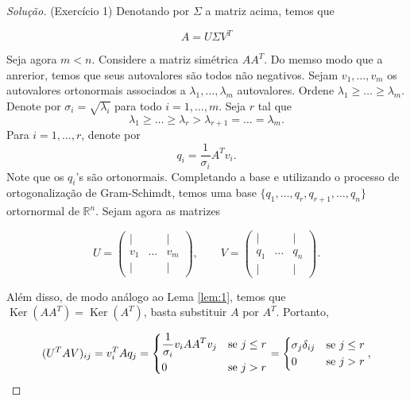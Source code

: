 \documentclass[a4paper,10pt]{article}
\newenvironment{solution}
  {\begin{proof}[Solução]}
  {\end{proof}}
\DeclareMathOperator{\Ker}{Ker}
\begin{document}
\begin{solution}{(Exercício 1)}
    Denotando por $\Sigma$ a matriz acima, temos que

    \begin{equation*}
      A = U\Sigma V^T
    \end{equation*}

    Seja agora $m<n$. Considere a matriz simétrica $AA^T$. Do memso modo que a anrerior,
    temos que seus autovalores são todos não negativos. Sejam $v_1,\dots,v_m$ os autovalores
    ortonormais associados a $\lambda_1, \dots, \lambda_m$ autovalores. Ordene
    $\lambda_1 \geq \dots \geq \lambda_m$. Denote por $\sigma_i = \sqrt{\lambda_i}$ para
    todo $i=1,\dots,m$. Seja $r$ tal que
    \begin{equation*}
      \lambda_1 \geq \dots \geq \lambda_r > \lambda_{r+1} = \dots = \lambda_m.
    \end{equation*}
    Para $i=1,\dots,r$, denote por
    \begin{equation*}
      q_i = \frac{1}{\sigma_i}A^Tv_i.
    \end{equation*}
    Note que os $q_i$'s são ortonormais. Completando a base e utilizando o processo
    de ortogonalização de Gram-Schimdt, temos uma base $\{q_1,\dots,q_r,q_{r+1}, \dots, q_n\}$
    ortornormal de $\mathbb{R}^n$. Sejam agora as matrizes

    \begin{equation*}
      U = \begin{pmatrix}
          \vert & & \vert \\
          v_1 & \dots & v_m \\
          \vert & & \vert
        \end{pmatrix},
        \quad \quad
      V = \begin{pmatrix}
              \vert & & \vert \\
              q_1 & \dots & q_n \\
              \vert & & \vert
            \end{pmatrix}.
    \end{equation*}

    Além disso, de modo análogo ao Lema \ref{lem:1}, temos que $\Ker(AA^T) = \Ker(A^T)$,
    basta substituir $A$ por $A^T$. Portanto,

    \begin{equation*}
      (U^TAV)_{ij} = v_i^TAq_j =
      \left\{
        \begin{split}
          &\frac{1}{\sigma_i} v_iAA^Tv_j && \textnormal{se } j \leq r \\
          &0 && \textnormal{se } j > r
        \end{split}
      \right.
      =
      \left\{
        \begin{split}
          &\sigma_j\delta_{ij} && \textnormal{se } j \leq r \\
          &0 && \textnormal{se } j > r
        \end{split}
      \right.
      ,
    \end{equation*}


\end{solution}
\end{document}
